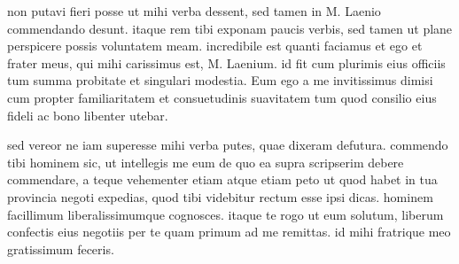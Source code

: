 


 non putavi fieri posse ut mihi verba dessent, sed tamen in M. Laenio commendando desunt. itaque rem tibi exponam paucis verbis, sed tamen ut plane perspicere possis voluntatem meam. incredibile est quanti faciamus et ego et frater meus, qui mihi carissimus est, M. Laenium. id fit cum plurimis eius officiis tum summa probitate et singulari modestia. Eum ego a me invitissimus dimisi cum propter familiaritatem et consuetudinis suavitatem tum quod consilio eius fideli ac bono libenter utebar.

 sed vereor ne iam superesse mihi verba putes, quae dixeram defutura. commendo tibi hominem sic, ut intellegis me eum de quo ea supra scripserim debere commendare, a teque vehementer etiam atque etiam peto ut quod habet in tua provincia negoti expedias, quod tibi videbitur rectum esse ipsi dicas. hominem facillimum liberalissimumque cognosces. itaque te rogo ut eum solutum, liberum confectis eius negotiis per te quam primum ad me remittas. id mihi fratrique meo gratissimum feceris.
